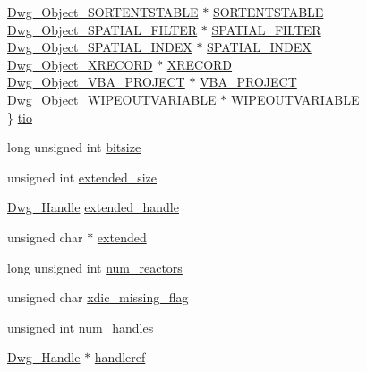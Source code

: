 \begin{DoxyCompactItemize}
\begin{tabbing}
\>\hyperlink{dwg_8h_ab80737ef6d710a08fc82ddb23751c112}{Dwg\_Object\_SORTENTSTABLE} $\ast$ \hyperlink{struct__dwg__object__object_a8797c0b1639056f105aaa93c900797c2}{SORTENTSTABLE}\\
\>\hyperlink{dwg_8h_a8d20f6a7f8636d35b7d75753dda57d0c}{Dwg\_Object\_SPATIAL\_FILTER} $\ast$ \hyperlink{struct__dwg__object__object_af51a8daff30f34de4b990c82f997867a}{SPATIAL\_FILTER}\\
\>\hyperlink{dwg_8h_a3908a0e64cafe68cc33d5a019bdeb761}{Dwg\_Object\_SPATIAL\_INDEX} $\ast$ \hyperlink{struct__dwg__object__object_aa08c30d73d21ddfde6abd1ad25ea6ff4}{SPATIAL\_INDEX}\\
\>\hyperlink{dwg_8h_af109746609ac728cc440bffa3d826d2a}{Dwg\_Object\_XRECORD} $\ast$ \hyperlink{struct__dwg__object__object_a193d583f3d3c5f2ce1309cdbb76259b1}{XRECORD}\\
\>\hyperlink{dwg_8h_afed73b736e71dd90a16265bfe2857ffa}{Dwg\_Object\_VBA\_PROJECT} $\ast$ \hyperlink{struct__dwg__object__object_ae3b8b40c4e888352cb83d7ab66749a2a}{VBA\_PROJECT}\\
\>\hyperlink{dwg_8h_afe230cecc01be6decf15a4c204f326e5}{Dwg\_Object\_WIPEOUTVARIABLE} $\ast$ \hyperlink{struct__dwg__object__object_a2f330f194eca10bf0aecdddb258e4cd2}{WIPEOUTVARIABLE}\\
\} \hyperlink{struct__dwg__object__object_af49208132d545aeeb6179c0a5e0a62aa}{tio}\\

\end{tabbing}\item 
long unsigned int \hyperlink{struct__dwg__object__object_ad9bdf6f4fef5a491ec781a2a6cb96016}{bitsize}
\item 
unsigned int \hyperlink{struct__dwg__object__object_a5a3acfcc6426dc653f8d4a6ca948562b}{extended\-\_\-size}
\item 
\hyperlink{dwg_8h_abeae9f49b46e36263ebcece699cfc8ef}{\-Dwg\-\_\-\-Handle} \hyperlink{struct__dwg__object__object_a6fe83678d1d4a0d379a21148e5df4921}{extended\-\_\-handle}
\item 
unsigned char $\ast$ \hyperlink{struct__dwg__object__object_a76adb880fab59ca2e0ac8f1470f0a66e}{extended}
\item 
long unsigned int \hyperlink{struct__dwg__object__object_a778fc22249387e4a084570d3fcbf576b}{num\-\_\-reactors}
\item 
unsigned char \hyperlink{struct__dwg__object__object_a247c740bbb989ef2b278060e56c2cdaf}{xdic\-\_\-missing\-\_\-flag}
\item 
unsigned int \hyperlink{struct__dwg__object__object_ac38c17aaf8e86e5e084b560bdf21235f}{num\-\_\-handles}
\item 
\hyperlink{dwg_8h_abeae9f49b46e36263ebcece699cfc8ef}{\-Dwg\-\_\-\-Handle} $\ast$ \hyperlink{struct__dwg__object__object_af8c2efcc49c681f2b9fb3fd9f50068ca}{handleref}
\end{DoxyCompactItemize}


